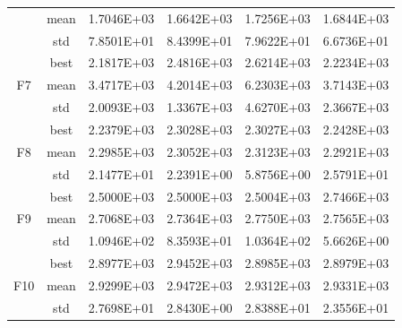 \documentclass{wzuthesis}
\begin{document}
\begin{table}[htbp]
\begin{tabular}{cccccc}
          & mean  & 1.7046E+03 & 1.6642E+03 & 1.7256E+03 & 1.6844E+03 \\
          & std   & 7.8501E+01 & 8.4399E+01 & 7.9622E+01 & 6.6736E+01 \\
    \multirow{3}[0]{*}{F7} & best  & 2.1817E+03 & 2.4816E+03 & 2.6214E+03 & 2.2234E+03 \\
          & mean  & 3.4717E+03 & 4.2014E+03 & 6.2303E+03 & 3.7143E+03 \\
          & std   & 2.0093E+03 & 1.3367E+03 & 4.6270E+03 & 2.3667E+03 \\
    \multirow{3}[0]{*}{F8} & best  & 2.2379E+03 & 2.3028E+03 & 2.3027E+03 & 2.2428E+03 \\
          & mean  & 2.2985E+03 & 2.3052E+03 & 2.3123E+03 & 2.2921E+03 \\
          & std   & 2.1477E+01 & 2.2391E+00 & 5.8756E+00 & 2.5791E+01 \\
    \multirow{3}[0]{*}{F9} & best  & 2.5000E+03 & 2.5000E+03 & 2.5004E+03 & 2.7466E+03 \\
          & mean  & 2.7068E+03 & 2.7364E+03 & 2.7750E+03 & 2.7565E+03 \\
          & std   & 1.0946E+02 & 8.3593E+01 & 1.0364E+02 & 5.6626E+00 \\
    \multirow{3}[1]{*}{F10} & best  & 2.8977E+03 & 2.9452E+03 & 2.8985E+03 & 2.8979E+03 \\
          & mean  & 2.9299E+03 & 2.9472E+03 & 2.9312E+03 & 2.9331E+03 \\
          & std   & 2.7698E+01 & 2.8430E+00 & 2.8388E+01 & 2.3556E+01 \\
    \bottomrule
    \end{tabular}%
\end{table}%
\end{document}
